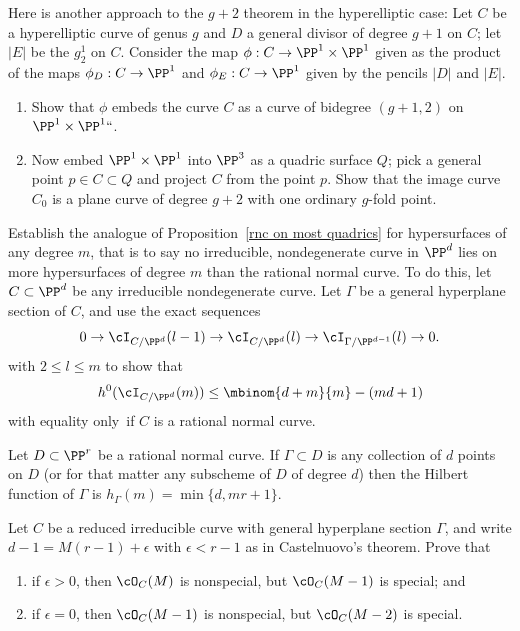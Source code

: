 \begin{exercise}
Here is another approach to the $g+2$ theorem in the hyperelliptic case:
%
Let $C$ be a
hyperelliptic
%
curve of genus $g$ and $D$ a general divisor
of degree $g+1$ on $C$; let $|E|$ be the $g^1_2$ on $C$.
Consider the map $\phi : C \to \PP^1 \times \PP^1$ given as the product
of the maps $\phi_D : C \to \PP^1$ and $\phi_E : C \to \PP^1$ given by
the pencils $|D|$ and $|E|$.
\begin{enumerate}
\item Show that $\phi$ embeds the curve $C$ as a curve of bidegree
$(g+1,2)$ on $\PP^1 \times \PP^1` `$.
\item Now embed $\PP^1 \times \PP^1$ into $\PP^3$ as a quadric surface
$Q$; pick a general point $p \in C \subset Q$ and project $C$ from the
point $p$. Show that the image curve $C_0$ is a plane curve of degree
$g+2$ with one ordinary $g$-fold point.
\end{enumerate}\label{tnih10.2}
\end{exercise}

\begin{exercise}\label{extremal m-ics}
Establish the analogue of Proposition~\ref{rnc on most quadrics}
for hypersurfaces of any degree $m$, that is to say no irreducible,
nondegenerate curve in $\PP^d$ lies on more hypersurfaces of degree $m$
than the
rational normal curve.
%
To do this, let $C\subset \PP^d$ be any irreducible nondegenerate
curve. Let $\Gamma$ be a general hyperplane section
of $C$, and use the exact sequences
$$
0 \to \cI_{C/\PP^d}(l-1) \to \cI_{C/\PP^d}(l) \to
\cI_{\Gamma/\PP^{d-1}}(l) \to 0.
$$
with $2 \leq l \leq m$ to show that
$$
h^0(\cI_{C/\PP^d}(m)) \leq  \mbinom{d+m}{m} - (md+1)
$$
with equality only~if $C$ is a rational normal curve.
\end{exercise}

\begin{exercise}\label{linear bound is sharp}
Let $D \subset \PP^r$ be a rational normal curve. If $\Gamma \subset D$
is any collection of $d$ points on $D$ (or for that matter any subscheme
of $D$ of degree $d$) then the
Hilbert function
%
of $\Gamma$ is
$ h_\Gamma(m) = \min\{d, mr+1\} $.
\end{exercise}

\begin{exercise}
Let $C$ be a reduced irreducible curve with general hyperplane section
$\Gamma$,
and write
$d-1 = M(r-1) +\epsilon$ with $\epsilon<r-1$ as in Castelnuovo's theorem.
Prove that
\begin{enumerate}
\item if $\epsilon > 0$, then $\cO_C(M)$ is nonspecial, but $\cO_C(M-1)$
is special; and
\item if $\epsilon = 0$, then $\cO_C(M-1)$ is nonspecial, but $\cO_C(M-2)$
%
is special.
\end{enumerate}\label{tnih10.6}
\end{exercise}

